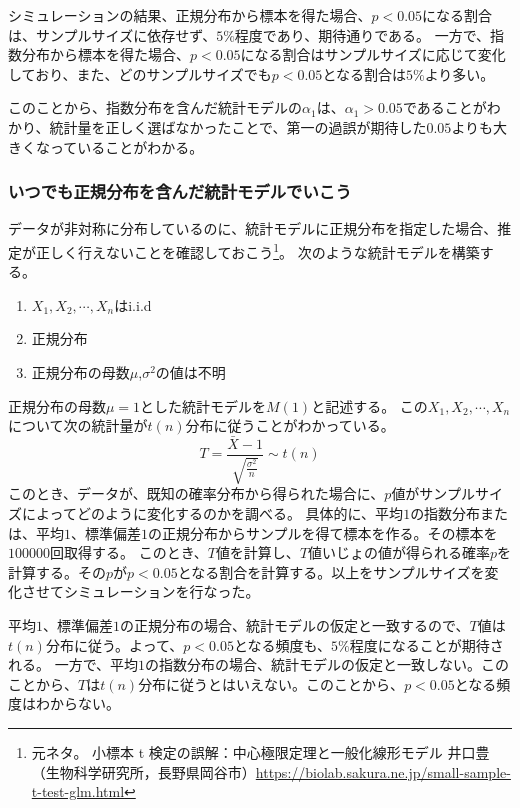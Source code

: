 シミュレーションの結果、正規分布から標本を得た場合、$p<0.05$になる割合は、サンプルサイズに依存せず、$5\%$程度であり、期待通りである。
一方で、指数分布から標本を得た場合、$p<0.05$になる割合はサンプルサイズに応じて変化しており、また、どのサンプルサイズでも$p<0.05$となる割合は$5\%$より多い。

このことから、指数分布を含んだ統計モデルの$\alpha_1$は、$\alpha_1>0.05$であることがわかり、統計量を正しく選ばなかったことで、第一の過誤が期待した$0.05$よりも大きくなっていることがわかる。

\subsubsection{いつでも正規分布を含んだ統計モデルでいこう}
データが非対称に分布しているのに、統計モデルに正規分布を指定した場合、推定が正しく行えないことを確認しておこう\footnote{元ネタ。
    小標本 t 検定の誤解：中心極限定理と一般化線形モデル 井口豊（生物科学研究所，長野県岡谷市）\url{https://biolab.sakura.ne.jp/small-sample-t-test-glm.html}}。
次のような統計モデルを構築する。
\begin{enumerate}
    \item $X_1,X_2,\cdots,X_n $はi.i.d
    \item 正規分布
    \item 正規分布の母数$\mu$,$\sigma^2$の値は不明
\end{enumerate}
正規分布の母数$\mu=1$とした統計モデルを$M(1)$と記述する。
この$X_1,X_2,\cdots,X_n$について次の統計量が$t(n)$分布に従うことがわかっている。
\begin{equation*}
    T = \frac{\bar{X}-1}{\sqrt{\frac{\sigma^2}{n}}} \sim t(n)
\end{equation*}
このとき、データが、既知の確率分布から得られた場合に、$p$値がサンプルサイズによってどのように変化するのかを調べる。
具体的に、平均$1$の指数分布または、平均$1$、標準偏差$1$の正規分布からサンプルを得て標本を作る。その標本を$100000$回取得する。
このとき、$T$値を計算し、$T$値いじょの値が得られる確率$p$を計算する。その$p$が$p<0.05$となる割合を計算する。以上をサンプルサイズを変化させてシミュレーションを行なった。

平均$1$、標準偏差$1$の正規分布の場合、統計モデルの仮定と一致するので、$T$値は$t(n)$分布に従う。よって、$p<0.05$となる頻度も、$5\%$程度になることが期待される。
一方で、平均$1$の指数分布の場合、統計モデルの仮定と一致しない。このことから、$T$は$t(n)$分布に従うとはいえない。このことから、$p<0.05$となる頻度はわからない。


